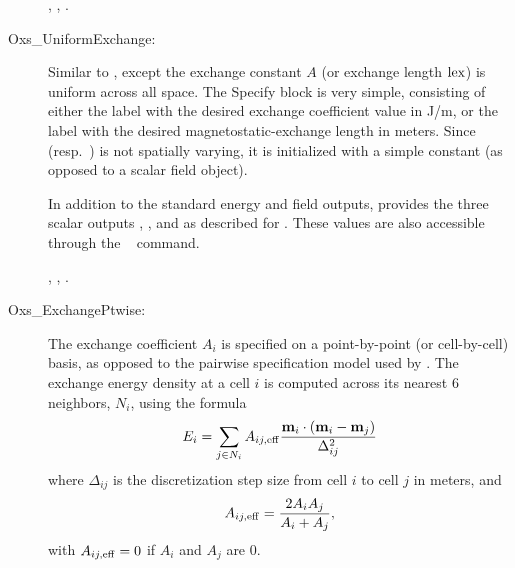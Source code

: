 \begin{description}
   \begin{ExampleMifs}
     , , .
   \end{ExampleMifs}

%
\item[Oxs\_UniformExchange:]
   Similar to , except the exchange constant $A$
   (or exchange length ${\rm lex}$) is uniform across all space.  The
   Specify block is very simple, consisting of either the label
    with the desired exchange coefficient value in J/m, or
   the label  with the desired magnetostatic-exchange
   length in meters.  Since  (resp.\ ) is not spatially
   varying, it is initialized with a simple constant (as opposed to a
   scalar field object).

   In addition to the standard energy and field outputs,
    provides the three scalar outputs
   , , and
    as described for .
   These values are also accessible through the \MIF\
    command.

   \begin{ExampleMifs}
     , , .
   \end{ExampleMifs}

%
\item[Oxs\_ExchangePtwise:]
   The exchange coefficient $A_i$ is specified on
   a point-by-point (or cell-by-cell) basis, as opposed to the pairwise
   specification model used by \cd{Oxs\_Exchange6Ngbr}.  The exchange
   energy density at a cell $i$ is computed across its nearest 6 neighbors,
   $N_i$, using the formula
   \begin{displaymath}
        E_i =  \sum_{j\in N_i} A_{ij,{\rm eff}}
         \frac{\textbf{m}_i\cdot\left(\textbf{m}_i - \textbf{m}_j\right)}{\Delta_{ij}^2}
   \end{displaymath}
   where $\Delta_{ij}$ is the discretization step size from cell $i$ to
   cell $j$ in meters, and
   \begin{displaymath}
         A_{ij,{\rm eff}} = \frac{2A_iA_j}{A_i+A_j},
   \end{displaymath}
   with $A_{ij,{\rm eff}} = 0$ if $A_i$ and $A_j$ are 0.


\end{description}
